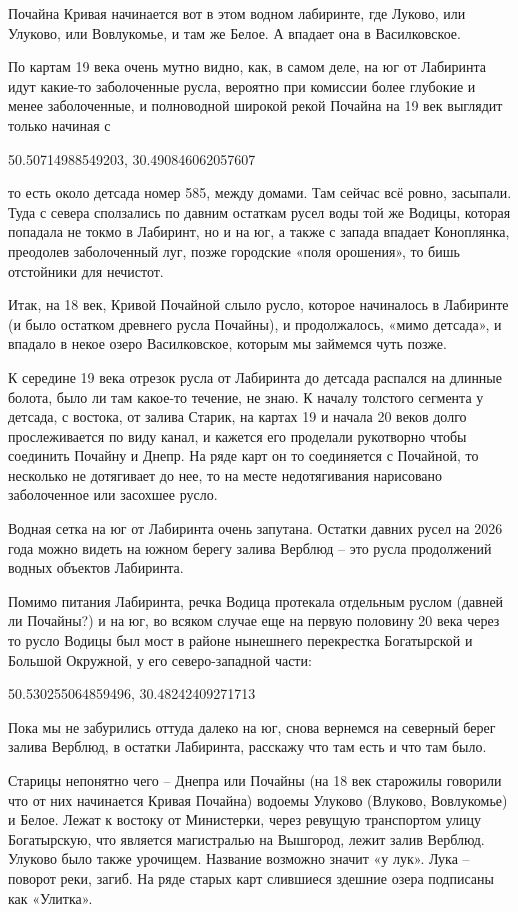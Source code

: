 Почайна Кривая начинается вот в этом водном лабиринте, где Луково, или Улуково, или Вовлукомье, и там же Белое. А впадает она в Василковское.

По картам 19 века очень мутно видно, как, в самом деле, на юг от Лабиринта идут какие-то заболоченные русла, вероятно при комиссии более глубокие и менее заболоченные, и полноводной широкой рекой Почайна на 19 век выглядит только начиная с 

50.50714988549203, 30.490846062057607

то есть около детсада номер 585, между домами. Там сейчас всё ровно, засыпали. Туда с севера сползались по давним остаткам русел воды той же Водицы, которая попадала не токмо в Лабиринт, но и на юг, а также с запада впадает Коноплянка, преодолев заболоченный луг, позже городские «поля орошения», то бишь отстойники для нечистот.

Итак, на 18 век, Кривой Почайной слыло русло, которое начиналось в Лабиринте (и было остатком древнего русла Почайны), и продолжалось, «мимо детсада», и впадало в некое озеро Василковское, которым мы займемся чуть позже.

К середине 19 века отрезок русла от Лабиринта до детсада распался на длинные болота, было ли там какое-то течение, не знаю. К началу толстого сегмента у детсада, с востока, от залива Старик, на картах 19 и начала 20 веков долго прослеживается по виду канал, и кажется его проделали рукотворно чтобы соединить Почайну и Днепр. На ряде карт он то соединяется с Почайной, то несколько не дотягивает до нее, то на месте недотягивания нарисовано заболоченное или засохшее русло.

Водная сетка на юг от Лабиринта очень запутана. Остатки давних русел на 2026 года можно видеть на южном берегу залива Верблюд – это русла продолжений водных объектов Лабиринта.

Помимо питания Лабиринта, речка Водица протекала отдельным руслом (давней ли Почайны?) и на юг, во всяком случае еще на первую половину 20 века через то русло Водицы был мост в районе нынешнего перекрестка Богатырской и Большой Окружной, у его северо-западной части:

50.530255064859496, 30.48242409271713

Пока мы не забурились оттуда далеко на юг, снова вернемся на северный берег залива Верблюд, в остатки Лабиринта, расскажу что там есть и что там было.

Старицы непонятно чего – Днепра или Почайны (на 18 век старожилы говорили что от них начинается Кривая Почайна) водоемы Улуково (Влуково, Вовлукомье) и Белое. Лежат к востоку от Министерки, через ревущую транспортом улицу Богатырскую, что является магистралью на Вышгород, лежит залив Верблюд. Улуково было также урочищем. Название возможно 
значит «у лук». Лука – поворот реки, загиб. 
На ряде старых карт слившиеся здешние озера подписаны как «Улитка».

